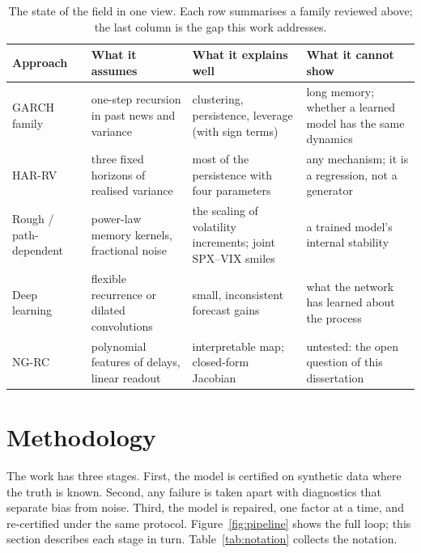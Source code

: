 \documentclass[12pt,a4paper]{article}
\begin{document}
\begin{table}[!htb]
\centering
\small
\begin{tabular}{p{2.6cm}p{4.0cm}p{3.6cm}p{3.4cm}}
\hline
Approach & What it assumes & What it explains well & What it cannot
show \\
\hline
GARCH family & one-step recursion in past news and variance & clustering,
persistence, leverage (with sign terms) & long memory; whether a learned
model has the same dynamics \\
HAR-RV & three fixed horizons of
realised variance & most of the persistence with four parameters & any
mechanism; it is a regression, not a generator \\
Rough / path-
dependent & power-law memory kernels, fractional noise & the scaling of
volatility increments; joint SPX--VIX smiles & a trained model's internal
stability \\
Deep learning & flexible recurrence or dilated
convolutions & small, inconsistent forecast gains & what the network
has learned about the process \\
NG-RC & polynomial features of
delays, linear readout & interpretable map; closed-form Jacobian &
untested: the open question of this dissertation \\
\hline
\end{tabular}
\caption{The state of the field in one view. Each row summarises a
family reviewed above; the last column is the gap this work addresses.}
\label{tab:map}
\end{table}

\newpage

\section{Methodology}

The work has three stages. First, the model is certified on synthetic
data where the truth is known. Second, any failure is taken apart with
diagnostics that separate bias from noise. Third, the model is repaired,
one factor at a time, and re-certified under the same protocol.
Figure~\ref{fig:pipeline} shows the full loop; this section describes
each stage in turn. Table~\ref{tab:notation} collects the notation.
\end{document}
